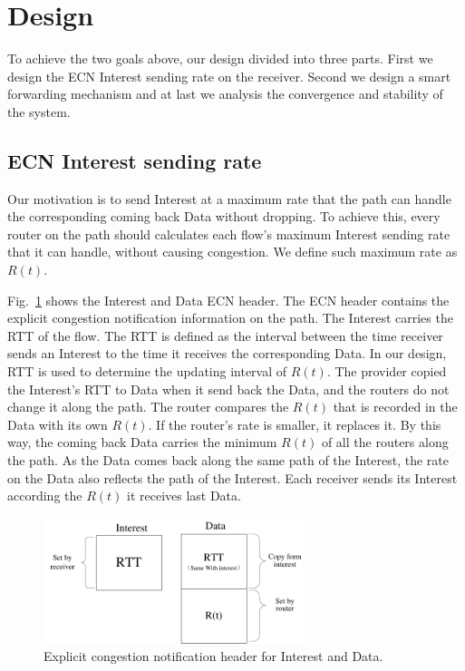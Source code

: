 \section{Design}

\label{sec:design}

To achieve the two goals above, our design divided into three parts. First we design the ECN Interest sending rate on the receiver. Second we design a smart forwarding mechanism and at last we analysis the convergence and stability of the system.

\subsection{ECN Interest sending rate}
Our motivation is to send Interest at a maximum rate that the path can handle the corresponding coming back Data without dropping. To achieve this, every router on the path should calculates each flow's maximum Interest sending rate that it can handle, without causing congestion. We define such maximum rate as $R(t)$.

Fig.~\ref{fig-header} shows the Interest and Data ECN header. The ECN header contains the explicit congestion notification information on the path. The Interest carries the RTT of the flow. The RTT is defined as the interval between the time receiver sends an Interest to the time it receives the corresponding Data. In our design, RTT is used to determine the updating interval of $R(t)$. The provider copied the Interest's RTT to Data when it send back the Data, and the routers do not change it along the path. The router compares the $R(t)$ that is recorded in the Data with its own $R(t)$. If the router's rate is smaller, it replaces it. By this way, the coming back Data carries the minimum $R(t)$ of all the routers along the path. As the Data comes back along the same path of the Interest, the rate on the Data also reflects the path of the Interest. Each receiver sends its Interest according the $R(t)$ it receives last Data.

\begin{figure}[t]
	\centering
	\includegraphics[width=3in]{header-ndn.pdf}
	\caption{Explicit congestion notification header for Interest and Data.}
	\label{fig-header}
\end{figure}

